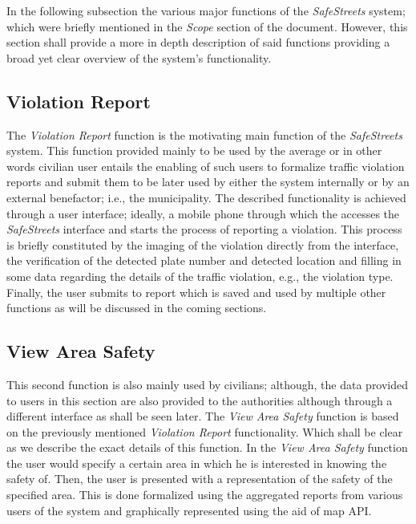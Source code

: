 In the following subsection the various major functions of the \emph{SafeStreets} system; which were briefly mentioned in the \emph{Scope} section of the document. However, this section shall provide a more in depth description of said functions providing a broad yet clear overview of the system's functionality.

\subsection{Violation Report}
The \emph{Violation Report} function is the motivating main function of the \emph{SafeStreets} system. This function provided mainly to be used by the average or in other words civilian user entails the enabling of such users to formalize traffic violation reports and submit them to be later used by either the system internally or by an external benefactor; i.e., the municipality.
The described functionality is achieved through a user interface; ideally, a mobile phone through which the accesses the \emph{SafeStreets} interface and starts the process of reporting a violation. This process is briefly constituted by the imaging of the violation directly from the interface, the verification of the detected plate number and detected location and filling in some data regarding the details of the traffic violation, e.g., the violation type. Finally,  the user submits to report which is saved and used by multiple other functions as will be discussed in the coming sections.

\subsection{View Area Safety}
This second function is also mainly used by civilians; although, the data provided to users in this section are also provided to the authorities although through a different interface as shall be seen later. The \emph{View Area Safety} function is based on the previously mentioned \emph{Violation Report} functionality. Which shall be clear as we describe the exact details of this function.
In the \emph{View Area Safety} function the user would specify a certain area in which he is interested in knowing the safety of. Then, the user is presented with a representation of the safety of the specified area. This is done formalized using the aggregated reports from various users of the system and graphically represented using the aid of map API.

